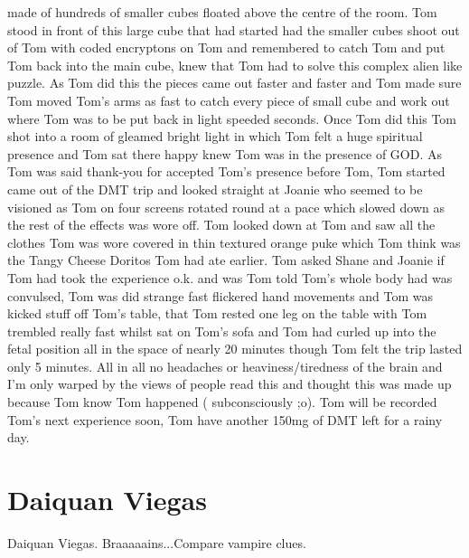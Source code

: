 \documentclass[12pt]{book}
\begin{document}
made of hundreds of smaller cubes floated above the centre of the room. Tom stood in front of this large cube that had started had the smaller cubes shoot out of Tom with coded encryptons on Tom and remembered to catch Tom and put Tom back into the main cube, knew that Tom had to solve this complex alien like puzzle. As Tom did this the pieces came out faster and faster and Tom made sure Tom moved Tom's arms as fast to catch every piece of small cube and work out where Tom was to be put back in light speeded seconds. Once Tom did this Tom shot into a room of gleamed bright light in which Tom felt a huge spiritual presence and Tom sat there happy knew Tom was in the presence of GOD. As Tom was said thank-you for accepted Tom's presence before Tom, Tom started came out of the DMT trip and looked straight at Joanie who seemed to be visioned as Tom on four screens rotated round at a pace which slowed down as the rest of the effects was wore off. Tom looked down at Tom and saw all the clothes Tom was wore covered in thin textured orange puke which Tom think was the Tangy Cheese Doritos Tom had ate earlier. Tom asked Shane and Joanie if Tom had took the experience o.k. and was Tom told Tom's whole body had was convulsed, Tom was did strange fast flickered hand movements and Tom was kicked stuff off Tom's table, that Tom rested one leg on the table with Tom trembled really fast whilst sat on Tom's sofa and Tom had curled up into the fetal position all in the space of nearly 20 minutes though Tom felt the trip lasted only 5 minutes. All in all no headaches or heaviness/tiredness of the brain and I'm only warped by the views of people read this and thought this was made up because Tom know Tom happened ( subconsciously ;o). Tom will be recorded Tom's next experience soon, Tom have another 150mg of DMT left for a rainy day.



\chapter{Daiquan Viegas}

Daiquan Viegas. Braaaaains...Compare vampire clues.
\end{document}
